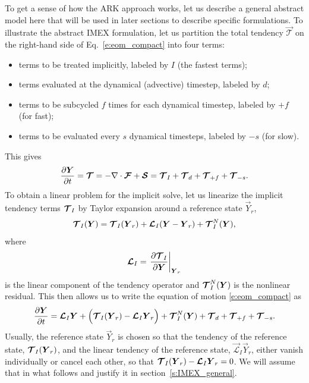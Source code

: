 \documentclass{report}
\begin{document}
{To get a sense of how the ARK approach works, let us describe a general abstract model here that will be used in later sections to describe specific formulations. To illustrate the abstract IMEX formulation, let us partition the total tendency $\vec{\mathcal{T}}$ on the right-hand side of Eq.~\eqref{e:eom_compact} into four terms: 
\begin{itemize}
    \item terms to be treated implicitly, labeled by $I$ (the fastest terms);
    \item terms evaluated at the dynamical (advective) timestep, labeled by $d$;
    \item terms to be subcycled $f$ times for each dynamical timestep, labeled by $+f$ (for fast);
    \item terms to be evaluated every $s$ dynamical timesteps, labeled by $-s$ (for slow).
\end{itemize}
This gives
\[
\frac{\partial \boldsymbol{{Y}}}{\partial t} = \boldsymbol{{\mathcal{T}}} = - \nabla \cdot \boldsymbol{{\mathcal{F}}} + \boldsymbol{{\mathcal{S}}} = \boldsymbol{{\mathcal{T}}}_{I} + \boldsymbol{{\mathcal{T}}}_{d} + \boldsymbol{{\mathcal{T}}}_{+f} + \boldsymbol{{\mathcal{T}}}_{-s}.
\]
To obtain a linear problem for the implicit solve, let us linearize the implicit tendency terms $\boldsymbol{{\mathcal{T}}}_{I}$ by Taylor expansion around a reference state $\vec{Y}_r$,
\begin{equation}\label{e:imex_linearization}
\boldsymbol{{\mathcal{T}}}_{I}(\boldsymbol{{Y}}) =  \boldsymbol{{\mathcal{T}}}_I(\boldsymbol{{Y}}_r) + \boldsymbol{{\mathcal{L}}}_I (\boldsymbol{{Y}} - \boldsymbol{{Y}}_r) + \boldsymbol{{\mathcal{T}}}^N_{I}(\boldsymbol{{Y}}),
\end{equation}
where 
\begin{equation}
    \boldsymbol{{\mathcal{L}}}_I = \left. \frac{\partial\boldsymbol{{\mathcal{T}}}_I}{\partial\boldsymbol{{Y}}}\right|_{\boldsymbol{{Y}}_r}
\end{equation} 
is the linear component of the tendency operator and $\boldsymbol{{\mathcal{T}}}^N_{I}(\boldsymbol{{Y}})$ is the nonlinear residual. This then allows us to write the equation of motion \eqref{e:eom_compact} as
\begin{equation}
\label{eq:IMEX}
\frac{\partial\boldsymbol{{Y}}}{\partial t} =  \boldsymbol{{\mathcal{L}}}_I \boldsymbol{{Y}} + \Bigl(\boldsymbol{{\mathcal{T}}}_I(\boldsymbol{{Y}}_r) - \boldsymbol{{\mathcal{L}}}_I \boldsymbol{{Y}}_r\Bigr) + \boldsymbol{{\mathcal{T}}}^N_{I}(\boldsymbol{{Y}}) + \boldsymbol{{\mathcal{T}}}_{d} + \boldsymbol{{\mathcal{T}}}_{+f} + \boldsymbol{{\mathcal{T}}}_{-s}.
\end{equation}
Usually, the reference state $\vec{Y}_r$ is chosen so that the tendency of the reference state, $\boldsymbol{{\mathcal{T}}}_I(\boldsymbol{{Y}}_r)$, and the linear tendency of the reference state, $\vec{\mathcal{L}}_I \vec{Y}_r$, either vanish individually or cancel each other, so that $\boldsymbol{{\mathcal{T}}}_I(\boldsymbol{{Y}}_r) - \boldsymbol{{\mathcal{L}}}_I \boldsymbol{{Y}}_r=0$. We will assume that in what follows and justify it in section~\ref{s:IMEX_general}.

}
\end{document}
